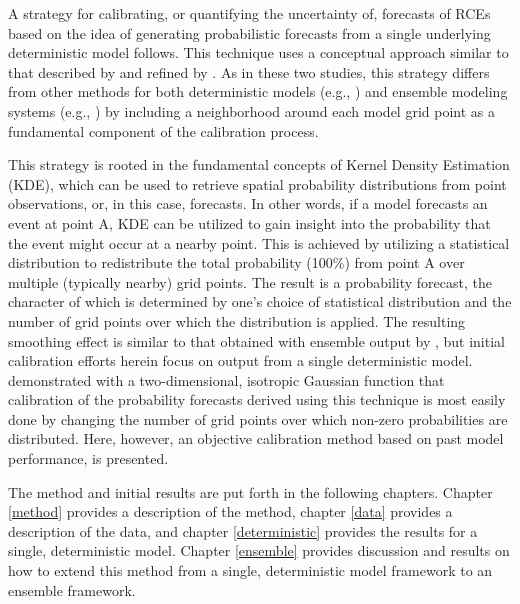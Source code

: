A strategy for calibrating, or quantifying the uncertainty of, forecasts of RCEs based on the idea of generating probabilistic forecasts from a single underlying deterministic model follows. This technique uses a conceptual approach similar to that described by \cite{Theis2005} and refined by \cite{Sobash2011}. As in these two studies, this strategy differs from other methods for both deterministic models (e.g., \citealp{Glahn1972}) and ensemble modeling systems (e.g., \citealp{Hamill1998, Raftery2005, Clark2009, Glahn2009}) by including a neighborhood around each model grid point as a fundamental component of the calibration process.

This strategy is rooted in the fundamental concepts of Kernel Density Estimation (KDE), which can be used to retrieve spatial probability distributions from point observations, or, in this case, forecasts. In other words, if a model forecasts an event at point A, KDE can be utilized to gain insight into the probability that the event might occur at a nearby point. This is achieved by utilizing a statistical distribution to redistribute the total probability (100\%) from point A over multiple (typically nearby) grid points. The result is a probability forecast, the character of which is determined by one's choice of statistical distribution and the number of grid points over which the distribution is applied. The resulting smoothing effect is similar to that obtained with ensemble output by \cite{Wilks2002}, but initial calibration efforts herein focus on output from a single deterministic model. \cite{Sobash2011} demonstrated with a two-dimensional, isotropic Gaussian function that calibration of the probability forecasts derived using this technique is most easily done by changing the number of grid points over which non-zero probabilities are distributed. Here, however, an objective calibration method based on past model performance, is presented.

The method and initial results are put forth in the following chapters. Chapter \ref{method} provides a description of the method, chapter \ref{data} provides a description of the data, and chapter \ref{deterministic} provides the results for a single, deterministic model. Chapter \ref{ensemble} provides discussion and results on how to extend this method from a single, deterministic model framework to an ensemble framework.


